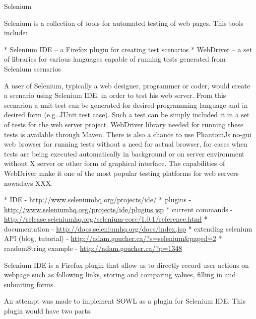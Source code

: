 %
%



%



\secc Selenium

Selenium is a collection of tools for automated testing of web pages. This tools include: 

\begitems
  * Selenium IDE -- a Firefox plugin for creating test scenarios
  * WebDriver -- a set of libraries for various languages capable of running
    tests generated from Selenium scenarios
\enditems

A user of Selenium, typically a web designer, programmer or coder, would create
a scenario using Selenium IDE, in order to test his web server. From this
scenarion a unit test can be generated for desired programming language and in
desired form (e.g. JUnit test case). Such a test can be simply included it in a
set of tests for the web server project. WebDriver library needed for running
these tests is available through Maven. There is also a chance to use PhantomJs
no-gui web browser for running tests without a need for actual browser, for
cases when tests are being executed automatically in background or on server
environment without X server or other form of graphical interface. The
capabilities of WebDriver make it one of the most popular testing platforms for
web servers nowadays XXX. 

\begitems
  * IDE - \url{http://www.seleniumhq.org/projects/ide/}
  * plugins - \url{http://www.seleniumhq.org/projects/ide/plugins.jsp}
  * current commands - \url{http://release.seleniumhq.org/selenium-core/1.0.1/reference.html}
  * documentation - \url{http://docs.seleniumhq.org/docs/index.jsp}
  * extending selenium API (blog, tutorial) - \url{http://adam.goucher.ca/?s=selenium&paged=2}
  \begitems
    * randomString example - \url{http://adam.goucher.ca/?p=1348}
  \enditems
\enditems

Selenium IDE is a Firefox plugin that allow us to directly record user actions
on webpage such as following links, storing and comparing values, filling in
and submiting forms. 

An attempt was made to implement SOWL as a plugin for Selenium IDE. This plugin
would have two parts: 

